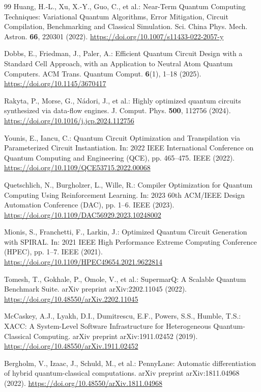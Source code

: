 \begin{thebibliography}{99}
Huang, H.-L., Xu, X.-Y., Guo, C., et al.: Near-Term Quantum Computing Techniques: Variational Quantum Algorithms, Error Mitigation, Circuit Compilation, Benchmarking and Classical Simulation. Sci. China Phys. Mech. Astron. \textbf{66}, 220301 (2022). \url{https://doi.org/10.1007/s11433-022-2057-y}

Dobbs, E., Friedman, J., Paler, A.: Efficient Quantum Circuit Design with a Standard Cell Approach, with an Application to Neutral Atom Quantum Computers. ACM Trans. Quantum Comput. \textbf{6}(1), 1--18 (2025). \url{https://doi.org/10.1145/3670417}

Rakyta, P., Morse, G., Nádori, J., et al.: Highly optimized quantum circuits synthesized via data-flow engines. J. Comput. Phys. \textbf{500}, 112756 (2024). \url{https://doi.org/10.1016/j.jcp.2024.112756}

Younis, E., Iancu, C.: Quantum Circuit Optimization and Transpilation via Parameterized Circuit Instantiation. In: 2022 IEEE International Conference on Quantum Computing and Engineering (QCE), pp. 465--475. IEEE (2022). \url{https://doi.org/10.1109/QCE53715.2022.00068}

Quetschlich, N., Burgholzer, L., Wille, R.: Compiler Optimization for Quantum Computing Using Reinforcement Learning. In: 2023 60th ACM/IEEE Design Automation Conference (DAC), pp. 1--6. IEEE (2023). \url{https://doi.org/10.1109/DAC56929.2023.10248002}

Mionis, S., Franchetti, F., Larkin, J.: Optimized Quantum Circuit Generation with SPIRAL. In: 2021 IEEE High Performance Extreme Computing Conference (HPEC), pp. 1--7. IEEE (2021). \url{https://doi.org/10.1109/HPEC49654.2021.9622814}

Tomesh, T., Gokhale, P., Omole, V., et al.: SupermarQ: A Scalable Quantum Benchmark Suite. arXiv preprint arXiv:2202.11045 (2022). \url{https://doi.org/10.48550/arXiv.2202.11045}

McCaskey, A.J., Lyakh, D.I., Dumitrescu, E.F., Powers, S.S., Humble, T.S.: XACC: A System-Level Software Infrastructure for Heterogeneous Quantum-Classical Computing. arXiv preprint arXiv:1911.02452 (2019). \url{https://doi.org/10.48550/arXiv.1911.02452}

Bergholm, V., Izaac, J., Schuld, M., et al.: PennyLane: Automatic differentiation of hybrid quantum-classical computations. arXiv preprint arXiv:1811.04968 (2022). \url{https://doi.org/10.48550/arXiv.1811.04968}


\end{thebibliography}
